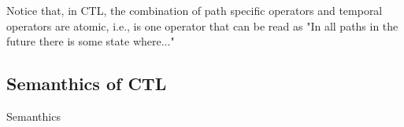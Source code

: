 \begin{frame}
	Notice that, in CTL, the combination of path specific operators and temporal operators are atomic, i.e., \A\F is one operator that can be read as "In all paths in the future there is some state where..."
\end{frame}

\subsection{Semanthics of CTL}
\begin{frame}{Semanthics}
	
\end{frame}